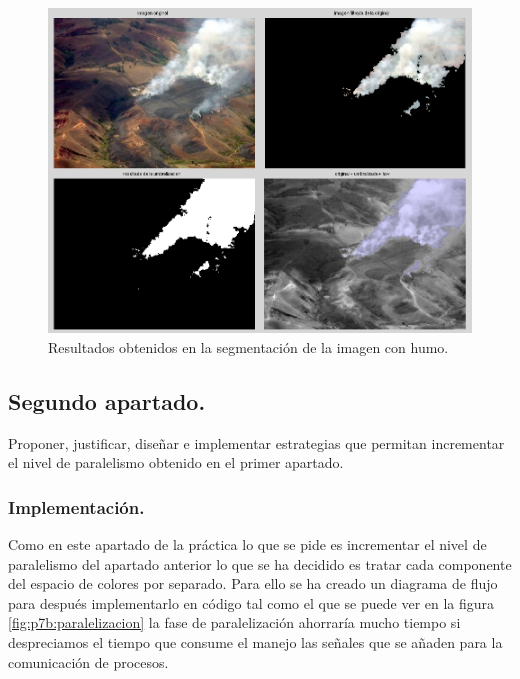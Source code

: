 \documentclass{article}
\begin{document}
\begin{figure}[h]
  \centering
    \includegraphics[width=1\textwidth]{img/p7a_humo.png}
  \caption{Resultados obtenidos en la segmentación de la imagen con humo.}
  \label{fig:p7a:humo}
\end{figure}

\subsection{Segundo apartado.}

	Proponer, justificar, diseñar e implementar estrategias que permitan incrementar el nivel de paralelismo obtenido en el primer apartado.
	
\clearpage	

\subsubsection{Implementación.}

	Como en este apartado de la práctica lo que se pide es incrementar el nivel de paralelismo del apartado anterior lo que se ha decidido es tratar cada componente del espacio de colores por separado. Para ello se ha creado un diagrama de flujo para después implementarlo en código tal como el que se puede ver en la figura \ref{fig:p7b:paralelizacion} la fase de paralelización ahorraría mucho tiempo si despreciamos el tiempo que consume el manejo las señales que se añaden para la comunicación de procesos.
\end{document}
